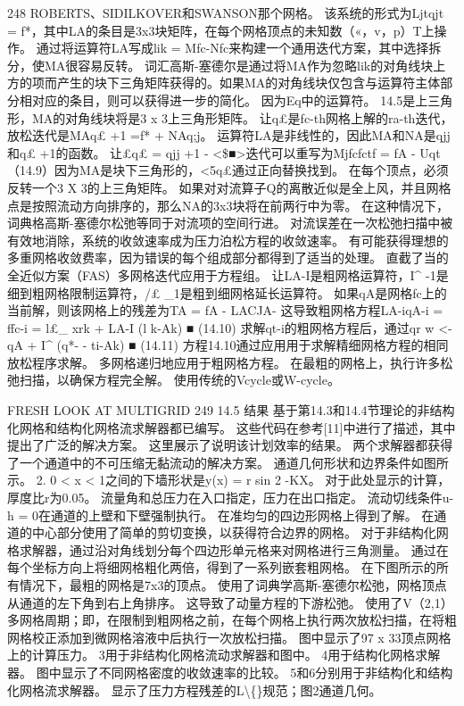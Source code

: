 \documentclass[UTF8,11pt,a4paper,openany,fontset=fandol]{ctexbook}
\begin{document}
248 ROBERTS、SIDILKOVER和SWANSON那个网格。 该系统的形式为Ljtqjt = f*，其中LA的条目是3x3块矩阵，在每个网格顶点的未知数（«，v，p）T上操作。 通过将运算符LA写成lik = Mfc-Nfc来构建一个通用迭代方案，其中选择拆分，使MA很容易反转。 词汇高斯-塞德尔是通过将MA作为忽略lik的对角线块上方的项而产生的块下三角矩阵获得的。如果MA的对角线块仅包含与运算符主体部分相对应的条目，则可以获得进一步的简化。 因为Eq中的运算符。 14.5是上三角形，MA的对角线块将是3 x 3上三角形矩阵。 让q£是fc-th网格上解的ra-th迭代，放松迭代是MAq£ +1 =f* + NAq;j。 运算符LA是非线性的，因此MA和NA是qjj和q£ +1的函数。 让£q£ = qjj +1 - <\$■>迭代可以重写为Mjfcfctf = fA - Uqt（14.9）因为MA是块下三角形的，<5q£通过正向替换找到。 在每个顶点，必须反转一个3 X 3的上三角矩阵。 如果对对流算子Q的离散近似是全上风，并且网格点是按照流动方向排序的，那么NA的3x3块将在前两行中为零。 在这种情况下，词典格高斯-塞德尔松弛等同于对流项的空间行进。 对流误差在一次松弛扫描中被有效地消除，系统的收敛速率成为压力泊松方程的收敛速率。 有可能获得理想的多重网格收敛费率，因为错误的每个组成部分都得到了适当的处理。 直截了当的全近似方案（FAS）多网格迭代应用于方程组。 让LA-I是粗网格运算符，I\textasciicircum{} -1是细到粗网格限制运算符，/£ \_1是粗到细网格延长运算符。 如果qA是网格fc上的当前解，则该网格上的残差为TA = fA - LACJA- 这导致粗网格方程LA-iqA-i = ffc-i = l£\_ xrk + LA-I (l k-Ak) ■ (14.10) 求解qt-i的粗网格方程后，通过qr w <- qA + I\textasciicircum{} (q*- - ti-Ak) ■ (14.11) 方程14.10通过应用用于求解精细网格方程的相同放松程序求解。 多网格递归地应用于粗网格方程。 在最粗的网格上，执行许多松弛扫描，以确保方程完全解。 使用传统的Vcycle或W-cycle。

FRESH LOOK AT MULTIGRID 249 14.5 结果 基于第14.3和14.4节理论的非结构化网格和结构化网格流求解器都已编写。 这些代码在参考[11]中进行了描述，其中提出了广泛的解决方案。 这里展示了说明该计划效率的结果。 两个求解器都获得了一个通道中的不可压缩无黏流动的解决方案。 通道几何形状和边界条件如图所示。 2. 0 < x < 1之间的下墙形状是y(x) = r sin 2 -KX。 对于此处显示的计算，厚度比r为0.05。 流量角和总压力在入口指定，压力在出口指定。 流动切线条件u-h = 0在通道的上壁和下壁强制执行。 在准均匀的四边形网格上得到了解。 在通道的中心部分使用了简单的剪切变换，以获得符合边界的网格。 对于非结构化网格求解器，通过沿对角线划分每个四边形单元格来对网格进行三角测量。 通过在每个坐标方向上将细网格粗化两倍，得到了一系列嵌套粗网格。 在下图所示的所有情况下，最粗的网格是7x3的顶点。 使用了词典学高斯-塞德尔松弛，网格顶点从通道的左下角到右上角排序。 这导致了动量方程的下游松弛。 使用了V（2,1）多网格周期；即，在限制到粗网格之前，在每个网格上执行两次放松扫描，在将粗网格校正添加到微网格溶液中后执行一次放松扫描。 图中显示了97 x 33顶点网格上的计算压力。 3用于非结构化网格流动求解器和图中。 4用于结构化网格求解器。 图中显示了不同网格密度的收敛速率的比较。 5和6分别用于非结构化和结构化网格流求解器。 显示了压力方程残差的L\textbackslash\{\}规范；图2通道几何。
\end{document}
